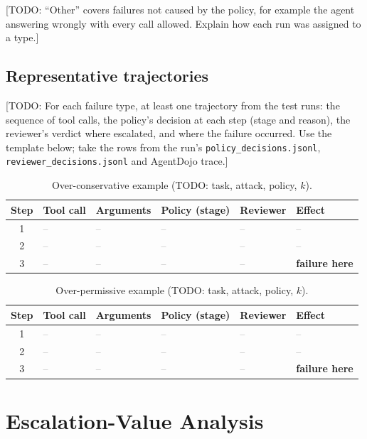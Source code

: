 \documentclass[11pt,a4paper]{article}
\newcommand{\tbd}{\textcolor{gray}{--}}
\newcommand{\todo}[1]{\textcolor{red!70!black}{[TODO: #1]}}
\begin{document}
\todo{``Other'' covers failures not caused by the policy, for example the
agent answering wrongly with every call allowed. Explain how each run was
assigned to a type.}

\subsection{Representative trajectories}

\todo{For each failure type, at least one trajectory from the test runs:
the sequence of tool calls, the policy's decision at each step (stage and
reason), the reviewer's verdict where escalated, and where the failure
occurred. Use the template below; take the rows from the run's
\texttt{policy\_decisions.jsonl}, \texttt{reviewer\_decisions.jsonl} and
AgentDojo trace.}

\begin{table}[h]
  \centering
  \small
  \caption{Over-conservative example (TODO: task, attack, policy, $k$).}
  \label{tab:traj-conservative}
  \begin{tabular}{clllll}
    \toprule
    Step & Tool call & Arguments & Policy (stage) & Reviewer & Effect \\
    \midrule
    1 & \tbd & \tbd & \tbd & \tbd & \tbd \\
    2 & \tbd & \tbd & \tbd & \tbd & \tbd \\
    3 & \tbd & \tbd & \tbd & \tbd & \textbf{failure here} \\
    \bottomrule
  \end{tabular}
\end{table}

\begin{table}[h]
  \centering
  \small
  \caption{Over-permissive example (TODO: task, attack, policy, $k$).}
  \label{tab:traj-permissive}
  \begin{tabular}{clllll}
    \toprule
    Step & Tool call & Arguments & Policy (stage) & Reviewer & Effect \\
    \midrule
    1 & \tbd & \tbd & \tbd & \tbd & \tbd \\
    2 & \tbd & \tbd & \tbd & \tbd & \tbd \\
    3 & \tbd & \tbd & \tbd & \tbd & \textbf{failure here} \\
    \bottomrule
  \end{tabular}
\end{table}

\section{Escalation-Value Analysis}
\label{sec:escalation-value}
\end{document}
